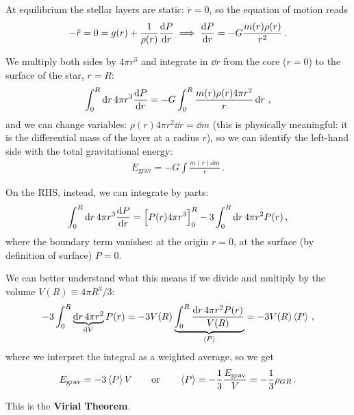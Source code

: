 \documentclass[main.tex]{subfiles}
\begin{document}
At equilibrium the stellar layers are static: \(\ddot{r} = 0\), so the equation of motion reads 
%
\begin{align}
  - \ddot{r} = 0 = g(r) + \frac{1}{\rho (r)} \dv{P}{r}
  \implies 
  \dv{P}{r} = - G \frac{m(r) \rho (r)}{r^2}
\,.
\end{align}

We multiply both sides by \(4 \pi r^3\) and integrate in \(\dd{r}\) from the core (\(r=0\)) to the surface of the star, \(r = R\): 
%
\begin{align}
  \int_0^{R} \dd{r} 4 \pi r^3 \dv{P}{r} = 
  - G \int_{0}^{R} \frac{m(r) \rho (r) 4 \pi r^2}{r} \dd{r}
\,,
\end{align}
%
and we can change variables: \(\rho (r) 4 \pi r^2 \dd{r} = \dd{m }\) (this is physically meaningful: it is the differential mass of the layer at a radius \(r\)), so we can identify the left-hand side with the total gravitational energy: 
%
\begin{align}
E _{\text{grav}} = -G \int \frac{m(r) \dd{m}}{r} 
\,. 
\end{align}

On the RHS, instead, we can integrate by parts: 
%
\begin{align}
\int_0^{R} \dd{r} 4 \pi r^3 \dv{P}{r} = 
  \qty[P(r) 4 \pi r^3]_0^{R} - 3 \int_{0}^{R} \dd{r} 4 \pi r^2 P(r)
\,,
\end{align}
%
where the boundary term vanishes: at the origin \(r =0\), at the surface (by definition of surface) \(P =0\).

We can better understand what this means if we divide and multiply by the volume \(V(R) \equiv 4 \pi R^3/3\): 
%
\begin{align}
  - 3 \int_{0}^{R} \underbrace{\dd{r} 4 \pi r^2}_{ \dd{V}} P(r) = - 3 V(R) \underbrace{\int_{0}^{R} \frac{ \dd{r} 4 \pi r^2   P(r)}{V(R)}}_{ \expval{P}} = - 3 V(R) \expval{P} 
\,,
\end{align}
%
where we interpret the integral as a weighted average, so we get 
%
\begin{align}
  E _{\text{grav}} = - 3 \expval{P} V 
  \qquad 
  \text{or} 
  \qquad 
  \expval{P} = -\frac{1}{3} \frac{E _{\text{grav}}}{V} = - \frac{1}{3} \rho_{GR}
\,.
\end{align}

This is the \textbf{Virial Theorem}. 

\end{document}

